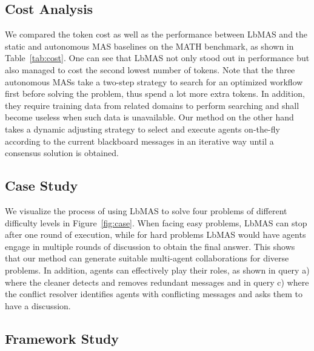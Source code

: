 \documentclass[11pt]{article}
\begin{document}
\subsection{Cost Analysis}

We compared the token cost as well as the performance between LbMAS and the static and autonomous MAS baselines on the MATH benchmark, as shown in Table~\ref{tab:cost}. One can see that LbMAS not only stood out in performance but also managed to cost the second lowest number of tokens. 
Note that the three autonomous MASs take a two-step strategy to search for an optimized workflow first before solving the problem, thus spend a lot more extra tokens. In addition, they require training data from related domains to perform searching and shall become useless when such data is unavailable. 
Our method on the other hand takes a dynamic adjusting strategy to select and execute agents on-the-fly according to the current blackboard messages in an iterative way until a consensus solution is obtained.

\subsection{Case Study}

 We visualize the process of using LbMAS to solve four problems of different difficulty levels in Figure~\ref{fig:case}. When facing easy problems, LbMAS can stop after one round of execution, while for hard problems LbMAS would have agents engage in multiple rounds of discussion to obtain the final answer. This shows that our method can generate suitable multi-agent collaborations for diverse problems. In addition, agents can effectively play their roles, as shown in query a) where the cleaner detects and removes redundant messages and in query c) where the conflict resolver identifies agents with conflicting messages and asks them to have a discussion.

\subsection{Framework Study}
\end{document}
